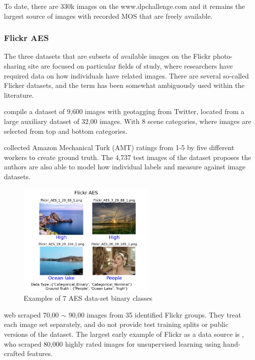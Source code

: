 To date, there are 330k images on the www.dpchallenge.com and it remains the largest source of images with recorded MOS that are freely available. 





\subsubsection{Flickr AES}

The three datasets that are subsets of available images on the Flickr photo-sharing site are focused on particular fields of study, where researchers have required data on how individuals have related images. There are several so-called Flicker datasets, and the term has been somewhat ambiguously used within the literature. 

\cite{Yin2012} compile a dataset of 9,600 images with geotagging from Twitter, located from a large auxiliary dataset of 32,00 images. With 8 scene categories, where images are selected from top and bottom categories.

\cite{Ren2017} collected Amazon Mechanical Turk (AMT) ratings from 1-5 by five different workers to create ground truth. The 4,737 test images of  the dataset proposes the authors are also able to model how individual labels and measure against image datasets. 

\begin{figure}[hp]
\centering
\includegraphics[width=0.6\textwidth]{figures/database_ims/Flickr AES.png}
  \caption{\label{fig:Flickr_AES} Examples of 7 AES data-set binary classes}
  \label{fig:AES_Example_}
\end{figure}

\cite{Chen2016} web scraped 70,00 $\sim$ 90,00 images from 35 identified Flickr groups. They treat each image set separately, and do not provide test training splits or public versions of the dataset. The largest early example of Flickr as a data source is \cite{Cheng2012}, who scraped 80,000 highly rated images for unsupervised learning using hand-crafted features. 

